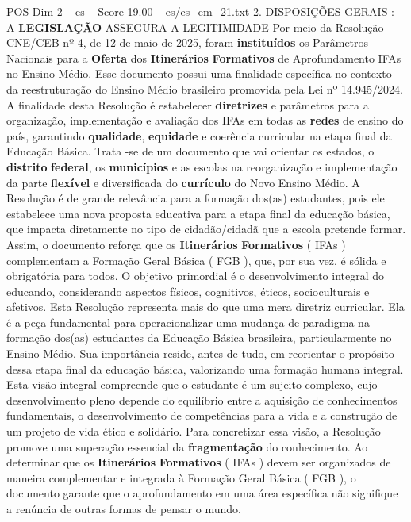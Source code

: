 \begin{textsample}{POS Dim 2 – es – Score 19.00 – es/es\_em\_21.txt}  \label{ex:f2_pos_217}
2.
DISPOSIÇÕES GERAIS : A \textbf{LEGISLAÇÃO} ASSEGURA A LEGITIMIDADE Por meio da Resolução CNE/CEB nº 4, de 12 de maio de 2025, foram \textbf{instituídos} os Parâmetros Nacionais para a \textbf{Oferta} dos \textbf{Itinerários} \textbf{Formativos} de Aprofundamento IFAs no Ensino Médio.
Esse documento possui uma finalidade específica no contexto da reestruturação do Ensino Médio brasileiro promovida pela Lei nº 14.945/2024.
A finalidade desta Resolução é estabelecer \textbf{diretrizes} e parâmetros para a organização, implementação e avaliação dos IFAs em todas as \textbf{redes} de ensino do país, garantindo \textbf{qualidade}, \textbf{equidade} e coerência curricular na etapa final da Educação Básica.
Trata -se de um documento que vai orientar os estados, o \textbf{distrito} \textbf{federal}, os \textbf{municípios} e as escolas na reorganização e implementação da parte \textbf{flexível} e diversificada do \textbf{currículo} do Novo Ensino Médio.
A Resolução é de grande relevância para a formação dos(as) estudantes, pois ele estabelece uma nova proposta educativa para a etapa final da educação básica, que impacta diretamente no tipo de cidadão/cidadã que a escola pretende formar.
Assim, o documento reforça que os \textbf{Itinerários} \textbf{Formativos} ( IFAs ) complementam a Formação Geral Básica ( FGB ), que, por sua vez, é sólida e obrigatória para todos.
O objetivo primordial é o desenvolvimento integral do educando, considerando aspectos físicos, cognitivos, éticos, socioculturais e afetivos.
Esta Resolução representa mais do que uma mera diretriz curricular.
Ela é a peça fundamental para operacionalizar uma mudança de paradigma na formação dos(as) estudantes da Educação Básica brasileira, particularmente no Ensino Médio.
Sua importância reside, antes de tudo, em reorientar o propósito dessa etapa final da educação básica, valorizando uma formação humana integral.
Esta visão integral compreende que o estudante é um sujeito complexo, cujo desenvolvimento pleno depende do equilíbrio entre a aquisição de conhecimentos fundamentais, o desenvolvimento de competências para a vida e a construção de um projeto de vida ético e solidário.
Para concretizar essa visão, a Resolução promove uma superação essencial da \textbf{fragmentação} do conhecimento.
Ao determinar que os \textbf{Itinerários} \textbf{Formativos} ( IFAs ) devem ser organizados de maneira complementar e integrada à Formação Geral Básica ( FGB ), o documento garante que o aprofundamento em uma área específica não signifique a renúncia de outras formas de pensar o mundo.

\end{textsample}
